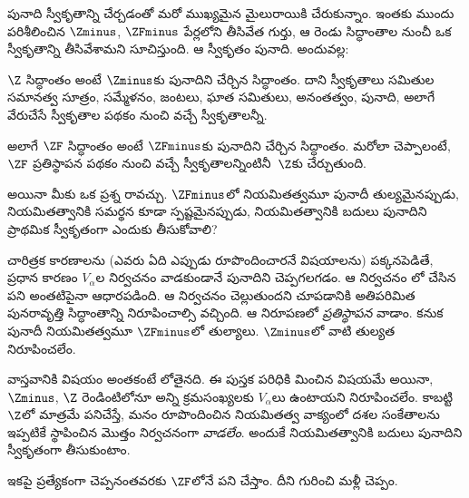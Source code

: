 \documentclass[../../../include/open-logic-section]{subfiles}
\begin{document}

పునాది స్వీకృతాన్ని చేర్చడంతో మరో ముఖ్యమైన మైలురాయికి చేరుకున్నాం.
ఇంతకు ముందు పరిశీలించిన $\Zminus$, $\ZFminus$ పేర్లలోని
తీసివేత గుర్తు, ఆ రెండు సిద్ధాంతాల నుంచీ ఒక స్వీకృతాన్ని తీసివేశామని
సూచిస్తుంది. ఆ స్వీకృతం పునాది. అందువల్ల:

\begin{defn}
$\Z$ సిద్ధాంతం అంటే $\Zminus$కు పునాదిని చేర్చిన సిద్ధాంతం.
దాని స్వీకృతాలు సమితుల సమానత్వ సూత్రం, సమ్మేళనం, జంటలు,
ఘాత సమితులు, అనంతత్వం, పునాది, అలాగే వేరుచేసే స్వీకృతాల పథకం
నుంచి వచ్చే స్వీకృతాలన్నీ.

అలాగే $\ZF$ సిద్ధాంతం అంటే $\ZFminus$కు పునాదిని చేర్చిన సిద్ధాంతం.
మరోలా చెప్పాలంటే, $\ZF$ ప్రతిస్థాపన పథకం నుంచి వచ్చే
స్వీకృతాలన్నింటినీ~$\Z$కు చేర్చుతుంది.
\end{defn}

అయినా మీకు ఒక ప్రశ్న రావచ్చు. $\ZFminus$లో నియమితత్వమూ పునాదీ తుల్యమైనప్పుడు, నియమితత్వానికి సమర్థన కూడా స్పష్టమైనప్పుడు, నియమితత్వానికి బదులు పునాదిని ప్రాథమిక స్వీకృతంగా ఎందుకు తీసుకోవాలి?

చారిత్రక కారణాలను (ఎవరు ఏది ఎప్పుడు రూపొందించారనే విషయాలను)
పక్కనపెడితే, ప్రధాన కారణం $V_\alpha$ల నిర్వచనం వాడకుండానే
పునాదిని చెప్పగలగడం. ఆ నిర్వచనం లో చేసిన
పని అంతటిపైనా ఆధారపడింది. ఆ నిర్వచనం చెల్లుతుందని చూపడానికి
అతిపరిమిత పునరావృత్తి సిద్ధాంతాన్ని నిరూపించాల్సి వచ్చింది.
ఆ నిరూపణలో \emph{ప్రతిస్థాపన} వాడాం. కనుక పునాదీ నియమితత్వమూ $\ZFminus$లో తుల్యాలు. $\Zminus$లో వాటి తుల్యత నిరూపించలేం.

వాస్తవానికి విషయం అంతకంటే లోతైనది. ఈ పుస్తక పరిధికి
మించిన విషయమే అయినా, $\Zminus$, $\Z$ రెండింటిలోనూ అన్ని క్రమసంఖ్యలకు $V_\alpha$లు ఉంటాయని నిరూపించలేం.
కాబట్టి $\Z$లో మాత్రమే పనిచేస్తే, మనం రూపొందించిన నియమితత్వ వాక్యంలో
దశల సంకేతాలను ఇప్పటికే స్థాపించిన మొత్తం నిర్వచనంగా
\emph{వాడలేం}. అందుకే నియమితత్వానికి బదులు పునాదిని స్వీకృతంగా తీసుకుంటాం.

ఇకపై ప్రత్యేకంగా చెప్పనంతవరకు $\ZF$లోనే పని చేస్తాం.
దీని గురించి మళ్లీ చెప్పం.
\end{document}
